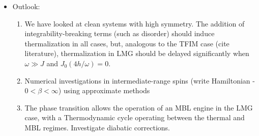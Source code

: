 \documentclass{article}
\begin{document}
\begin{itemize}
\item Outlook:
\begin{enumerate}
	\item We have looked at clean systems with high symmetry. The addition of integrability-breaking terms (such as disorder) should induce thermalization in all cases, but, analogous to the TFIM case (cite literature), thermalization in LMG should be delayed significantly when $\omega \gg J$ and $J_0(4h/\omega)=0$.
	\item Numerical investigations in intermediate-range spins (write Hamiltonian - $0< \beta < \infty$) using approximate methods 
	\item The phase transition allows the operation of an MBL engine in the LMG case, with a Thermodynamic cycle operating between the thermal and MBL regimes. Investigate diabatic corrections.
\end{enumerate}
\end{itemize}



\printbibliography %
\end{document}

